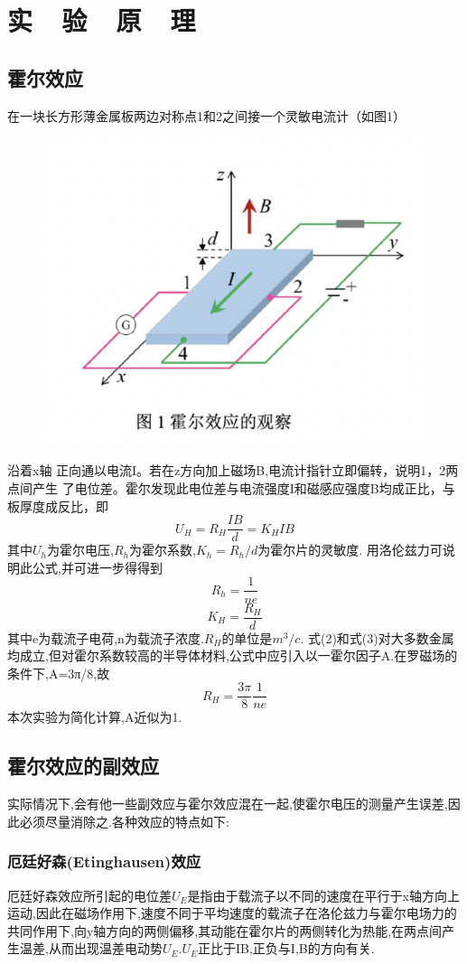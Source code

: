 \documentclass{thuemp}
\begin{document}
\section{实~~验~~原~~理}
\subsection{霍尔效应}
在一块长方形薄金属板两边对称点1和2之间接一个灵敏电流计（如图1）
\begin{figure}[H]
	\centering
	\includegraphics[width=0.8\linewidth]{./image/1.png}
\end{figure}
沿着x轴
正向通以电流I。若在z方向加上磁场B,电流计指针立即偏转，说明1，2两点间产生
了电位差。霍尔发现此电位差与电流强度I和磁感应强度B均成正比，与板厚度成反比，即
\[U_{H}=R_{H}\frac{IB}{d}=K_{H}IB\]
其中$U_{h}$为霍尔电压,$R_{h}$为霍尔系数,$K_{h}=R_{h}/d$为霍尔片的灵敏度.
用洛伦兹力可说明此公式,并可进一步得得到
\[R_{h}=\frac{1}{ne}\]
\[K_{H}=\frac{R_{H}}{d}\]
其中e为载流子电荷,n为载流子浓度.$R_{H}$的单位是$m^{3}/c$.
式(2)和式(3)对大多数金属均成立,但对霍尔系数较高的半导体材料,公式中应引入以一霍尔因子A.在罗磁场的条件下,A=3π/8,故
\[R_{H}=\frac{3\pi}{8}\frac{1}{ne}\]
本次实验为简化计算,A近似为1.
\subsection{霍尔效应的副效应}
实际情况下,会有他一些副效应与霍尔效应混在一起,使霍尔电压的测量产生误差,因此必须尽量消除之.各种效应的特点如下:
\subsubsection{厄廷好森(Etinghausen)效应}
厄廷好森效应所引起的电位差$U_{E}$是指由于载流子以不同的速度在平行于x轴方向上运动,因此在磁场作用下,速度不同于平均速度的载流子在洛伦兹力与霍尔电场力的共同作用下,向y轴方向的两侧偏移,其动能在霍尔片的两侧转化为热能,在两点间产生温差,从而出现温差电动势$U_{E}$.$U_{E}$正比于IB,正负与I,B的方向有关.
\end{document}
